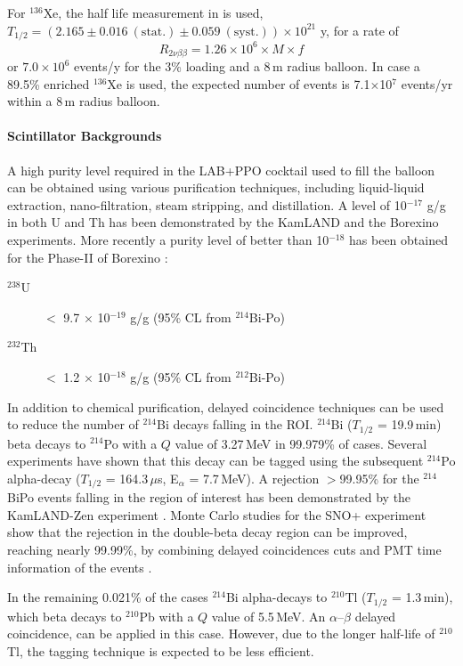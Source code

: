 For $^{136}$Xe, the half life measurement in \cite{gando16, exo14} is used,
$T_{1/2}=(2.165\pm0.016~\mathrm{(stat.)}\pm0.059~\mathrm{(syst.)})\times10^{21}$
y, for a rate of
\begin{equation}
R_{2\nu\beta\beta} = 1.26 \times 10^{6} \times M \times f
\end{equation} 
or $7.0\times10^6$ events/y for the 3\% loading and a 8\,m radius balloon.
In case a 89.5\% enriched $^{136}$Xe is used, the expected number of events is
7.1$\times$10$^{7}$ events/yr within a 8\,m radius balloon.
 
\paragraph{Scintillator Backgrounds}
A high purity level required in the LAB+PPO cocktail used to fill the balloon
can be obtained using various purification techniques, including liquid-liquid
extraction, nano-filtration, steam stripping, and distillation. A level
of 10$^{-17}$ g/g in both U and Th has been demonstrated by the
KamLAND \cite{kam03} and the Borexino \cite{bxo09} experiments. More recently
a purity level of better than 10$^{-18}$ has been obtained for the Phase-II
of Borexino \cite{bxo16}:
\begin{description}
\item[$^{238}$U] $<$ 9.7 $\times$ 10$^{-19}$ g/g (95\% CL from $^{214}$Bi-Po)
\item[$^{232}$Th] $<$ 1.2 $\times$ 10$^{-18}$ g/g (95\% CL from $^{212}$Bi-Po)
\end{description}

In addition to chemical purification, delayed coincidence techniques can
be used to reduce the number of $^{214}$Bi decays falling in the ROI.
$^{214}$Bi ($T_{1/2}$ = 19.9\,min) beta decays to $^{214}$Po with a $Q$ value
of 3.27\,MeV in 99.979\% of cases. Several experiments have shown that this
decay can be tagged using the subsequent $^{214}$Po alpha-decay
($T_{1/2}$ = 164.3\,$\mu$s, E$_{\alpha}$ = 7.7\,MeV). 
A rejection $>$99.95\% for the $^{214}$BiPo events falling in the region of interest has been 
demonstrated by the KamLAND-Zen experiment \cite{KD-Zen}. Monte Carlo studies for the SNO+ experiment show that the rejection in the double-beta decay region can be improved, reaching nearly 99.99\%, by combining delayed coincidences cuts and PMT time information of the events \cite{snop16}.

In the remaining 0.021\% of the cases $^{214}$Bi alpha-decays to $^{210}$Tl
($T_{1/2}$ = 1.3\,min), which beta decays to $^{210}$Pb with a $Q$ value of
5.5\,MeV. An $\alpha$--$\beta$ delayed coincidence, can be applied in this
case. However, due to the longer half-life of $^{210}$Tl, the tagging
technique is expected to be less efficient.

